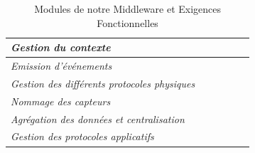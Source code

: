 \begin{table}[h!]
\begin{tabular}{|l|c|c|c|c|c|}
		\textit{Gestion du contexte}                         &                                                                                  &                                                                               & \checkmark                                                                 & \checkmark                                                                    &                                                                        \\ \hline
		\textit{Emission d'événements}                       &                                                                                  &                                                                               & \checkmark                                                                 & \checkmark                                                                    &                                                                        \\ \hline
		\textit{Gestion des différents protocoles physiques} &                                                                                  &                                                                               &                                                                            &                                                                               & \checkmark                                                             \\ \hline
		\textit{Nommage des capteurs}                        &                                                                                  & \checkmark                                                                    &                                                                            &                                                                               &                                                                        \\ \hline
		\textit{Agrégation des données et centralisation}    &                                                                                  &                                                                               & \checkmark                                                                 &                                                                               &                                                                        \\ \hline
		\textit{Gestion des protocoles applicatifs}          &                                                                                  &                                                                               &                                                                            &                                                                               & \checkmark                                                             \\ \hline
	\end{tabular}
	\caption{Modules de notre Middleware et Exigences Fonctionnelles}
\end{table}

